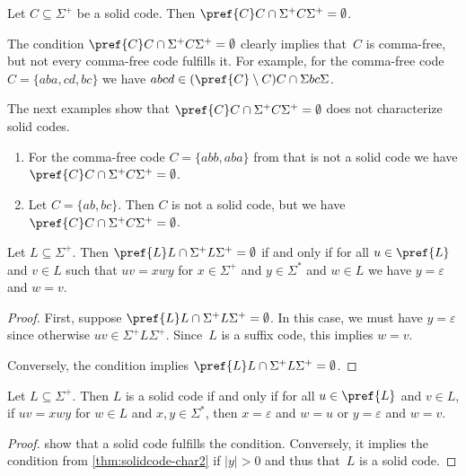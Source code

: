 \begin{corollary} \label{cor:solidcode-char2}
	Let $C \subseteq \Sigma^+$ be a solid code.
	Then $\pref{C}C \cap \Sigma^+ C \Sigma^+ = \emptyset$.
\end{corollary}

The condition $\pref{C}C \cap \Sigma^+ C \Sigma^+ = \emptyset$
clearly implies that~$C$ is comma-free,
but not every comma-free code fulfills it.
For example, for the comma-free code $C = \{aba,cd,bc\}$
we have $abcd \in (\pref{C}\setminus C)C \cap \Sigma bc \Sigma$.

The next examples show that $\pref{C}C \cap \Sigma^+ C \Sigma^+ = \emptyset$
does not characterize solid codes.

\begin{example}
	\begin{enumerate}
		\item For the comma-free code $C = \{abb,aba\}$ from 
		that is not a solid code we have $\pref{C}C \cap \Sigma^+ C \Sigma^+ = \emptyset$.
		
		\item Let $C = \{ab,bc\}$. Then $C$ is not a solid code,
		but we have $\pref{C}C \cap \Sigma^+ C \Sigma^+ = \emptyset$.
	\end{enumerate} 	
\end{example}

\begin{proposition} \label{constrsync:prop:prefLintersect}
	Let $L \subseteq \Sigma^+$.
	Then $\pref{L}L \cap \Sigma^+ L \Sigma^+ = \emptyset$
	if and only if for all $u \in \pref{L}$ and $v \in L$
	such that $uv = xwy$ for $x \in \Sigma^+$ and $y \in \Sigma^*$ and $w \in L$
	we have $y = \varepsilon$ and $w = v$.
\end{proposition}
\begin{proof}
	First, suppose $\pref{L}L \cap \Sigma^+ L \Sigma^+ = \emptyset$.
	In this case, we must have $y = \varepsilon$ since
	otherwise $uv \in \Sigma^+ L \Sigma^+$.
	Since~$L$ is a suffix code, this implies $w = v$.
	
	Conversely, the condition 
	implies $\pref{L}L \cap \Sigma^+ L \Sigma^+ = \emptyset$.	
\end{proof}

\begin{corollary} \label{cor:solidcode-char3}
	Let $L \subseteq \Sigma^+$.
	Then $L$ is a solid code
	if and only if for all $u \in \pref{L}$ and $v \in L$,
	if $uv = xwy$ for  $w \in L$ and $x,y \in \Sigma^*$,
	then $x = \varepsilon$ and $w = u$
	or $y = \varepsilon$ and $w = v$.
\end{corollary}
\begin{proof}
	 show 
	that a solid code fulfills the condition.
	Conversely, it implies the condition
	from \cref{thm:solidcode-char2} if $|y| > 0$
	and thus that~$L$ is a solid code.
\end{proof}

